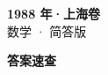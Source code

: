 \documentclass[zihao=-4, a4paper]{ctexart}
\begin{document}
\begin{center}
  {\Large\bfseries 1988 年·上海卷}\\[4pt]
  {\large 数学 · 简答版}
\end{center}
\medskip
{}

\clearpage
{}
\begin{center}{\Large\bfseries 答案速查}\end{center}
\medskip

\end{document}
